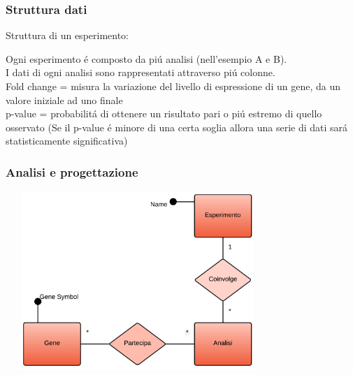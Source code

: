 \documentclass[hyperref={pdfpagelabels=false}]{beamer}
\begin{document}
\begin{frame}\frametitle{Struttura dati}

Struttura di un esperimento: \bigskip

\bigskip

Ogni esperimento \'e composto da pi\'u analisi (nell'esempio A e B).\\
I dati di ogni analisi sono rappresentati attraverso pi\'u colonne.\\
\bigskip
Fold change = misura la variazione del livello di espressione di un gene, da un valore iniziale ad uno finale\\
\bigskip
p-value = probabilit\'a di ottenere un risultato pari o pi\'u estremo di quello osservato (Se il p-value \'e minore di una certa soglia allora una serie di dati sar\'a statisticamente significativa)


\end{frame}

\begin{frame}\frametitle{Analisi e progettazione}
\includegraphics[width=10cm,height=6.75cm]{er.png}
\end{frame}
\end{document}
